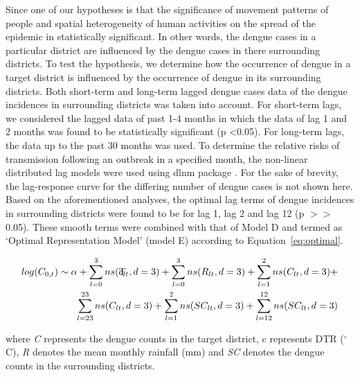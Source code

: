 \documentclass{bmcart}
\begin{document}

Since one of our hypotheses is that the significance of movement patterns of people and spatial heterogeneity of human activities on the spread of the epidemic in statistically significant. In other words, the dengue cases in a particular district are influenced by the dengue cases in there surrounding districts. To test the hypothesis, we determine how the occurrence of dengue in a target district is influenced by the occurrence of dengue in its surrounding districts. Both short-term and long-term lagged dengue cases data of the dengue incidences in surrounding districts was taken into account. For short-term lags, we considered the lagged data of past 1-4 months in which the data of lag 1 and 2 months was found to be statistically significant (p \textless 0.05). For long-term lags, the data up to the past 30 months was used. To determine the relative risks of transmission following an outbreak in a specified month, the non-linear distributed lag models were used using dlnm package \cite{gasparrini2011distributed}. For the sake of brevity, the lag-response curve for the differing number of dengue cases is not shown here. Based on the aforementioned analyses, the optimal lag terms of dengue incidences in surrounding districts were found to be for lag 1, lag 2 and lag 12 (p \(>\!\!>\) 0.05).  These smooth terms were combined with that of Model D and termed as `Optimal Representation Model' (model E) according to Equation~\ref{eq:optimal}.

\begin{equation}
\begin{aligned}
\label{eq:optimal}
log (C_{0,t}) \sim \alpha +  \sum_{l=0}^{3} ns(\rlap{T}c _ {lt}, d =3) + \sum_{l=0}^{3} ns(R_ {lt}, d =3) +\sum_{l=1}^{2} ns(C_ {lt}, d =3)  + \\
\sum_{l=23}^{23} ns(C_ {lt}, d =3) + \sum_{l=1}^{2} ns(SC_ {lt}, d =3) + \sum_{l=12}^{12} ns(SC_ {lt}, d =3)
\end{aligned}
\end{equation}

where \textit{C} represents the dengue counts in the target district, c represents DTR ($^{\circ}$C), \textit{R} denotes the mean monthly rainfall (mm) and \textit{SC} denotes the dengue counts in the surrounding districts. 
\end{document}
